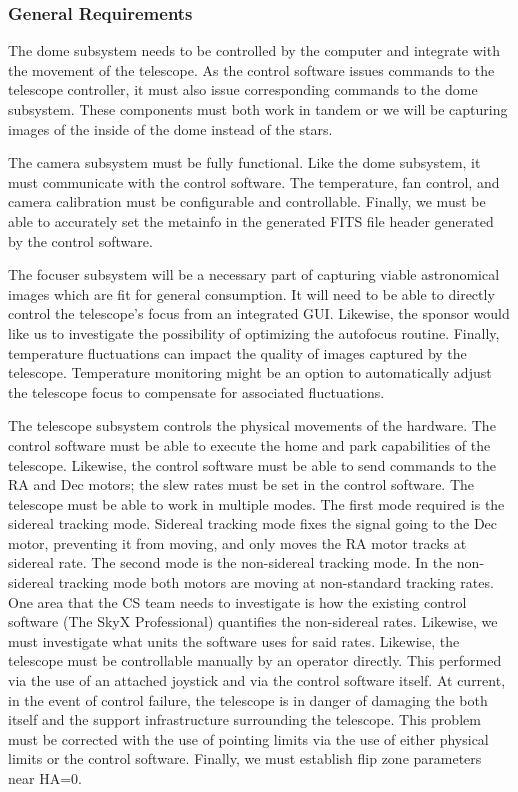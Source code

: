 \documentclass[12pt]{report}
\begin{document}
\subsubsection*{General Requirements}

The dome subsystem needs to be controlled by the computer and integrate with the movement of the telescope. As the control software issues commands to the telescope controller, it must also issue corresponding commands to the dome subsystem. These components must both work in tandem or we will be capturing images of the inside of the dome instead of the stars.

The camera subsystem must be fully functional. Like the dome subsystem, it must communicate with the control software. The temperature, fan control, and camera calibration must be configurable and controllable. Finally, we must be able to accurately set the metainfo in the generated FITS file header generated by the control software.

The focuser subsystem will be a necessary part of capturing viable astronomical images which are fit for general consumption. It will need to be able to directly control the telescope’s focus from an integrated GUI. Likewise, the sponsor would like us to investigate the possibility of optimizing the autofocus routine. Finally, temperature fluctuations can impact the quality of images captured by the telescope. Temperature monitoring might be an option to automatically adjust the telescope focus to compensate for associated fluctuations.

The telescope subsystem controls the physical movements of the hardware. The control software must be able to execute the home and park capabilities of the telescope. Likewise, the control software must be able to send commands to the RA and Dec motors; the slew rates must be set in the control software. The telescope must be able to work in multiple modes. The first mode required is the sidereal tracking mode. Sidereal tracking mode fixes the signal going to the Dec motor, preventing it from moving, and only moves the RA motor tracks at sidereal rate. The second mode is the non-sidereal tracking mode. In the non-sidereal tracking mode both motors are moving at non-standard tracking rates. One area that the CS team needs to investigate is how the existing control software (The SkyX Professional) quantifies the non-sidereal rates. Likewise, we must investigate what units the software uses for said rates. Likewise, the telescope must be controllable manually by an operator directly. This performed via the use of an attached joystick and via the control software itself. At current, in the event of control failure, the telescope is in danger of damaging the both itself and the support infrastructure surrounding the telescope. This problem must be corrected with the use of pointing limits via the use of either physical limits or the control software. Finally, we must establish flip zone parameters near HA=0.
\end{document}
